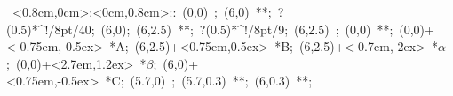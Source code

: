 \hbox{
\xy    <0.8cm,0cm>:<0cm,0.8cm>::
       (0,0) ; (6,0) **\dir{-}; ?(0.5)*^!/8pt/{40};
       (6,0); (6,2.5) **\dir{-}; ?(0.5)*^!/8pt/{9}; 
       (6,2.5) ; (0,0) **\dir{-};  
       (0,0)+<-0.75em,-0.5ex> *{A};
       (6,2.5)+<0.75em,0.5ex> *{B};
       (6,2.5)+<-0.7em,-2ex> *\hbox{$\alpha$};       (0,0)+<2.7em,1.2ex> *\hbox{$\beta$};
       (6,0)+<0.75em,-0.5ex> *{C};
       (5.7,0) ; (5.7,0.3) **\dir{-}; (6,0.3) **\dir{-};       
\endxy}
	   
